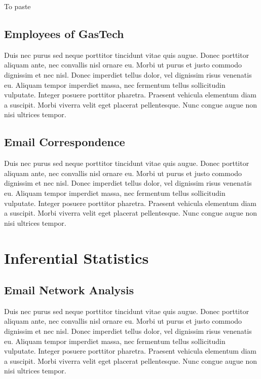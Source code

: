 \documentclass{acm_proc_article-sp}
\begin{document}
To paste

\hypertarget{employees-of-gastech}{%
\subsection{Employees of GasTech}\label{employees-of-gastech}}

Duis nec purus sed neque porttitor tincidunt vitae quis augue. Donec
porttitor aliquam ante, nec convallis nisl ornare eu. Morbi ut purus et
justo commodo dignissim et nec nisl. Donec imperdiet tellus dolor, vel
dignissim risus venenatis eu. Aliquam tempor imperdiet massa, nec
fermentum tellus sollicitudin vulputate. Integer posuere porttitor
pharetra. Praesent vehicula elementum diam a suscipit. Morbi viverra
velit eget placerat pellentesque. Nunc congue augue non nisi ultrices
tempor.

\hypertarget{email-correspondence}{%
\subsection{Email Correspondence}\label{email-correspondence}}

Duis nec purus sed neque porttitor tincidunt vitae quis augue. Donec
porttitor aliquam ante, nec convallis nisl ornare eu. Morbi ut purus et
justo commodo dignissim et nec nisl. Donec imperdiet tellus dolor, vel
dignissim risus venenatis eu. Aliquam tempor imperdiet massa, nec
fermentum tellus sollicitudin vulputate. Integer posuere porttitor
pharetra. Praesent vehicula elementum diam a suscipit. Morbi viverra
velit eget placerat pellentesque. Nunc congue augue non nisi ultrices
tempor.

\hypertarget{inferential-statistics}{%
\section{Inferential Statistics}\label{inferential-statistics}}

\hypertarget{email-network-analysis}{%
\subsection{Email Network Analysis}\label{email-network-analysis}}

Duis nec purus sed neque porttitor tincidunt vitae quis augue. Donec
porttitor aliquam ante, nec convallis nisl ornare eu. Morbi ut purus et
justo commodo dignissim et nec nisl. Donec imperdiet tellus dolor, vel
dignissim risus venenatis eu. Aliquam tempor imperdiet massa, nec
fermentum tellus sollicitudin vulputate. Integer posuere porttitor
pharetra. Praesent vehicula elementum diam a suscipit. Morbi viverra
velit eget placerat pellentesque. Nunc congue augue non nisi ultrices
tempor.
\end{document}
